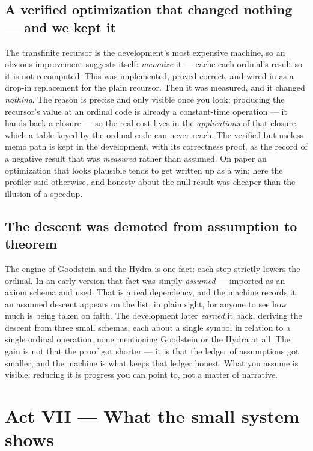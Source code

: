 \documentclass[11pt]{article}
\begin{document}
\subsection*{A verified optimization that changed nothing --- and we kept it}

The transfinite recursor is the development's most expensive machine, so an
obvious improvement suggests itself: \emph{memoize} it --- cache each ordinal's
result so it is not recomputed. This was implemented, proved correct, and wired
in as a drop-in replacement for the plain recursor. Then it was measured, and it
changed \emph{nothing}. The reason is precise and only visible once you look:
producing the recursor's value at an ordinal code is already a constant-time
operation --- it hands back a closure --- so the real cost lives in the
\emph{applications} of that closure, which a table keyed by the ordinal code can
never reach. The verified-but-useless memo path is kept in the development, with
its correctness proof, as the record of a negative result that was
\emph{measured} rather than assumed. On paper an optimization that looks
plausible tends to get written up as a win; here the profiler said otherwise, and
honesty about the null result was cheaper than the illusion of a speedup.

\subsection*{The descent was demoted from assumption to theorem}

The engine of Goodstein and the Hydra is one fact: each step strictly lowers the
ordinal. In an early version that fact was simply \emph{assumed} --- imported as
an axiom schema and used. That is a real dependency, and the machine records it:
an assumed descent appears on the  list, in plain sight,
for anyone to see how much is being taken on faith. The development later
\emph{earned} it back, deriving the descent from three small schemas, each about
a single symbol in relation to a single ordinal operation, none mentioning
Goodstein or the Hydra at all. The gain is not that the proof got shorter --- it
is that the ledger of assumptions got smaller, and the machine is what keeps that
ledger honest. What you assume is visible; reducing it is progress you can point
to, not a matter of narrative.

\section{Act VII --- What the small system shows}
\end{document}
